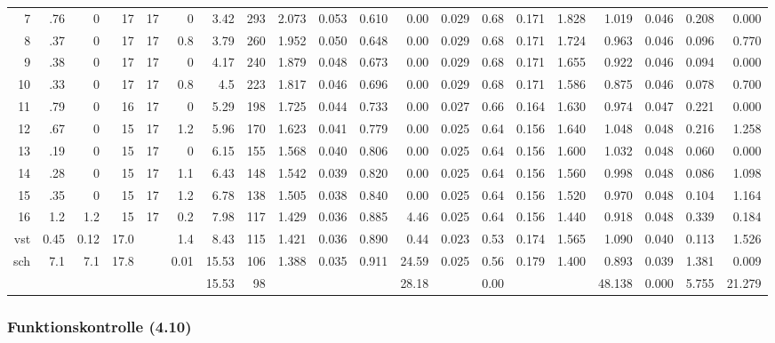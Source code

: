 \documentclass[a4paper,10pt,twoside]{article}
\begin{document}
\begin{landscape}
\begin{table}[htbp]
\begin{tabulary}{\textwidth}{rrrrrrrrrrrrrrrrrrrr}
7 & .76 & 0 & 17 & 17 & 0 & 3.42 & 293 & 2.073 & 0.053 & 0.610 & 0.00 & 0.029 & 0.68 & 0.171 & 1.828 & 1.019 & 0.046 & 0.208 & 0.000\\
8 & .37 & 0 & 17 & 17 & 0.8 & 3.79 & 260 & 1.952 & 0.050 & 0.648 & 0.00 & 0.029 & 0.68 & 0.171 & 1.724 & 0.963 & 0.046 & 0.096 & 0.770\\
9 & .38 & 0 & 17 & 17 & 0 & 4.17 & 240 & 1.879 & 0.048 & 0.673 & 0.00 & 0.029 & 0.68 & 0.171 & 1.655 & 0.922 & 0.046 & 0.094 & 0.000\\
10 & .33 & 0 & 17 & 17 & 0.8 & 4.5 & 223 & 1.817 & 0.046 & 0.696 & 0.00 & 0.029 & 0.68 & 0.171 & 1.586 & 0.875 & 0.046 & 0.078 & 0.700\\
11 & .79 & 0 & 16 & 17 & 0 & 5.29 & 198 & 1.725 & 0.044 & 0.733 & 0.00 & 0.027 & 0.66 & 0.164 & 1.630 & 0.974 & 0.047 & 0.221 & 0.000\\
12 & .67 & 0 & 15 & 17 & 1.2 & 5.96 & 170 & 1.623 & 0.041 & 0.779 & 0.00 & 0.025 & 0.64 & 0.156 & 1.640 & 1.048 & 0.048 & 0.216 & 1.258\\
13 & .19 & 0 & 15 & 17 & 0 & 6.15 & 155 & 1.568 & 0.040 & 0.806 & 0.00 & 0.025 & 0.64 & 0.156 & 1.600 & 1.032 & 0.048 & 0.060 & 0.000\\
14 & .28 & 0 & 15 & 17 & 1.1 & 6.43 & 148 & 1.542 & 0.039 & 0.820 & 0.00 & 0.025 & 0.64 & 0.156 & 1.560 & 0.998 & 0.048 & 0.086 & 1.098\\
15 & .35 & 0 & 15 & 17 & 1.2 & 6.78 & 138 & 1.505 & 0.038 & 0.840 & 0.00 & 0.025 & 0.64 & 0.156 & 1.520 & 0.970 & 0.048 & 0.104 & 1.164\\
16 & 1.2 & 1.2 & 15 & 17 & 0.2 & 7.98 & 117 & 1.429 & 0.036 & 0.885 & 4.46 & 0.025 & 0.64 & 0.156 & 1.440 & 0.918 & 0.048 & 0.339 & 0.184\\
\hline
vst & 0.45 & 0.12 & 17.0 &  & 1.4 & 8.43 & 115 & 1.421 & 0.036 & 0.890 & 0.44 & 0.023 & 0.53 & 0.174 & 1.565 & 1.090 & 0.040 & 0.113 & 1.526\\
sch & 7.1 & 7.1 & 17.8 &  & 0.01 & 15.53 & 106 & 1.388 & 0.035 & 0.911 & 24.59 & 0.025 & 0.56 & 0.179 & 1.400 & 0.893 & 0.039 & 1.381 & 0.009\\
\hline
 &  &  &  &  &  & 15.53 & 98 &  &  &  & 28.18 &  & 0.00 &  &  & 48.138 & 0.000 & 5.755 & 21.279\\
\end{tabulary}
\end{table}

\end{landscape}

\subsubsection{Funktionskontrolle (4.10)}
\label{sec:org8413c79}
\end{document}

